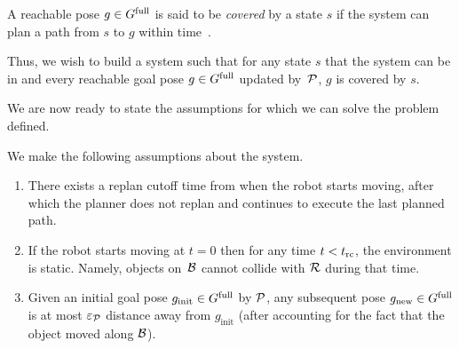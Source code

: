\documentclass[conference]{IEEEtran}
\begin{document}
\begin{definition}
    A reachable pose $g \in G^{\textrm{full}}$ is said to be \emph{covered} by a state $s$ if 
    the system can plan a path from $s$ to $g$ within time~\Tbound.
\end{definition}

Thus, we wish to build a system such that 
for any state $s$ that the system can be in 
and every reachable goal pose $g \in G^{\textrm{full}}$ updated by~$\mathcal{P}$,
$g$ is covered by $s$.


We are now ready to state the assumptions for which we can solve the problem defined.

We make the following assumptions about the system.
\begin{enumerate}[label={\textbf{A\arabic*}},leftmargin=0.75cm]
    

 
    \item \label{assum:4} There exists a replan cutoff time \Trc from when the robot starts moving, after which the planner does not replan and continues to execute the last planned path.

    \item \label{assum:5} If the robot starts moving at $t = 0$ then for any time $t < t_{\textrm{rc}}$, the environment is static. Namely, objects on~$\mathcal{B}$ cannot collide with $\mathcal{R}$ during that time.
    
    \item \label{assum:3} Given an initial goal pose $g_{\textrm{init}} \in G^{\textrm{full}}$ by $\mathcal{P}$, any subsequent pose $g_{\textrm{new}} \in G^{\textrm{full}}$ is at most $\varepsilon_\mathcal{P}$ distance away from $g_{\textrm{init}}$ (after accounting for the fact that the object moved along $\mathcal{B}$).
    

\end{enumerate}
\end{document}
